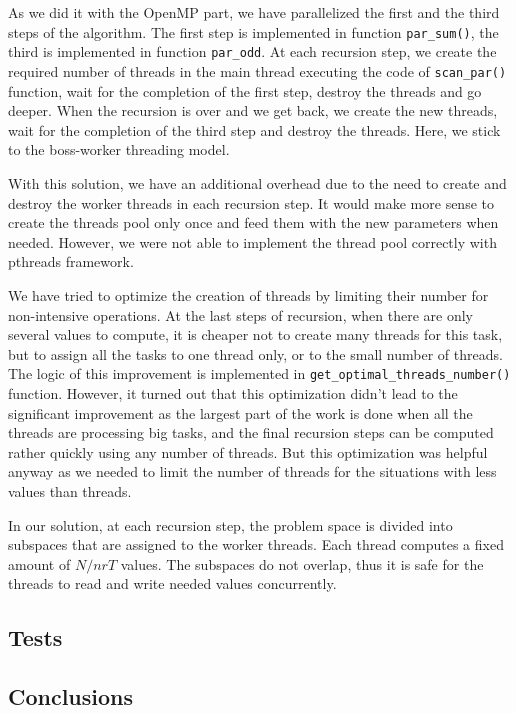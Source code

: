 \documentclass[a4paper,10pt,notitlepage]{article}
\begin{document}
As we did it with the OpenMP part, we have parallelized the first and the third steps of the algorithm. The first step is implemented in function \lstinline{par_sum()}, the third is implemented in function \lstinline{par_odd}. At each recursion step, we create the required number of threads in the main thread executing the code of \lstinline{scan_par()} function, wait for the completion of the first step, destroy the threads and go deeper. When the recursion is over and we get back, we create the new threads, wait for the completion of the third step and destroy the threads. Here, we stick to the boss-worker threading model.

With this solution, we have an additional overhead due to the need to create and destroy the worker threads in each recursion step. It would make more sense to create the threads pool only once and feed them with the new parameters when needed. However, we were not able to implement the thread pool correctly with pthreads framework.

We have tried to optimize the creation of threads by limiting their number for non-intensive operations. At the last steps of recursion, when there are only several values to compute, it is cheaper not to create many threads for this task, but to assign all the tasks to one thread only, or to the small number of threads. The logic of this improvement is implemented in \lstinline{get_optimal_threads_number()} function. However, it turned out that this optimization didn't lead to the significant improvement as the largest part of the work is done when all the threads are processing big tasks, and the final recursion steps can be computed rather quickly using any number of threads. But this optimization was helpful anyway as we needed to limit the number of threads for the situations with less values than threads.   

In our solution, at each recursion step, the problem space is divided into subspaces that are assigned to the worker threads. Each thread computes a fixed amount of $N/nrT$ values. The subspaces do not overlap, thus it is safe for the threads to read and write needed values concurrently.

\subsection{Tests}

\subsection{Conclusions}
\end{document}
